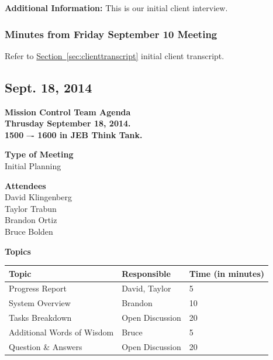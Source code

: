 \documentclass[pdftex,11pt]{article}
\begin{document}
\vspace*{2.5mm}
{ \large \bfseries \noindent Additional Information:}
This is our initial client interview.

\subsubsection[short]{Minutes from Friday September 10 Meeting}
Refer to \hyperref[sec:clienttranscript]{Section~\ref{sec:clienttranscript}} initial client  transcript.


\subsection{Sept. 18, 2014}
{ \huge \bfseries Mission Control Team Agenda \\[0.4cm] }
{ \huge \bfseries Thrusday September  18, 2014.\\1500 –-  1600  in JEB   Think  Tank. \\[0.4cm] }
\vspace*{2.5mm}

{ \large \bfseries \hspace*{2 mm} Type of Meeting\\}
\hspace*{12 mm} Initial Planning
\vspace*{1.5mm}

{ \large \bfseries \hspace*{2 mm} Attendees\\}
\hspace*{12mm} David Klingenberg\\
\hspace*{12mm} Taylor Trabun\\
\hspace*{12mm} Brandon Ortiz\\
\hspace*{12mm} Bruce Bolden\\
\vspace*{1.5mm}

{ \large \bfseries \noindent Topics}
\vspace*{2.5mm}

\begin{tabular}{| l | l | l |}
  \hline
  \bfseries Topic & \bfseries Responsible & \bfseries Time (in minutes) \\ \hline
  Progress Report  & David, Taylor &  5 \\ \hline
  System Overview & Brandon & 10 \\ \hline
  Tasks Breakdown & Open Discussion & 20 \\ \hline
  Additional Words of Wisdom & Bruce & 5 \\ \hline
  Question \&  Answers  & Open Discussion & 20 \\ 
  \hline
\end{tabular}
\end{document}
